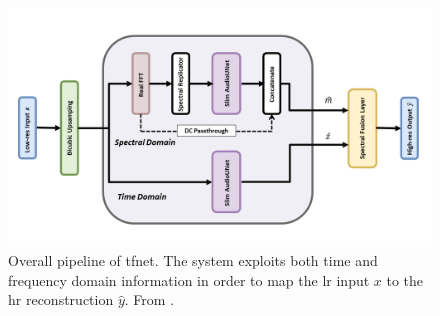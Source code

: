 \begin{figure}[!htb]
	\begin{center}
		\includegraphics[scale=0.48]{img/tfnet_pipeline.png}
		\captionsetup{margin=2cm}
		\caption{Overall pipeline of \gls{tfnet}. The system exploits both time and frequency domain information in order to map the \gls{lr} input $x$ to the \gls{hr} reconstruction $\hat{y}$. From \cite{lim2018time}.}
		\label{fig:tfnet_pipeline}
	\end{center}
\end{figure}


